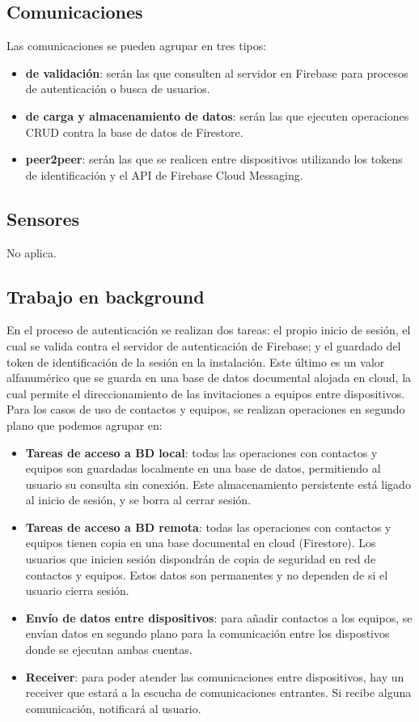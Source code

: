 \documentclass[a4paper,openright,12pt]{article}
\begin{document}
\subsection{Comunicaciones}
Las comunicaciones se pueden agrupar en tres tipos:
\begin{itemize}
    \item \textbf{de validación}: serán las que consulten al servidor en Firebase para procesos de autenticación o busca de usuarios.
    \item \textbf{de carga y almacenamiento de datos}: serán las que ejecuten operaciones CRUD contra la base de datos de Firestore.
    \item \textbf{peer2peer}: serán las que se realicen entre dispositivos utilizando los tokens de identificación y el API de Firebase Cloud Messaging.
\end{itemize}
\subsection{Sensores}
No aplica.
\subsection{Trabajo en background}
En el proceso de autenticación se realizan dos tareas: el propio inicio de sesión, el cual se valida contra el servidor de autenticación de Firebase; y el guardado del token de identificación de la sesión en la instalación. Este último es un valor alfanumérico que se guarda en una base de datos documental alojada en cloud, la cual permite el direccionamiento de las invitaciones a equipos entre dispositivos.
Para los casos de uso de contactos y equipos, se realizan operaciones en segundo plano que podemos agrupar en:
\begin{itemize}
    \item \textbf{Tareas de acceso a BD local}: todas las operaciones con contactos y equipos son guardadas localmente en una base de datos, permitiendo al usuario su consulta sin conexión. Este almacenamiento persistente está ligado al inicio de sesión, y se borra al cerrar sesión.
    \item \textbf{Tareas de acceso a BD remota}: todas las operaciones con contactos y equipos tienen copia en una base documental en cloud (Firestore). Los usuarios que inicien sesión dispondrán de copia de seguridad en red de contactos y equipos. Estos datos son permanentes y no dependen de si el usuario cierra sesión.
    \item \textbf{Envío de datos entre dispositivos}: para añadir contactos a los equipos, se envían datos en segundo plano para la comunicación entre los dispostivos donde se ejecutan ambas cuentas.
    \item \textbf{Receiver}: para poder atender las comunicaciones entre dispositivos, hay un receiver que estará a la escucha de comunicaciones entrantes. Si recibe alguna comunicación, notificará al usuario.
\end{itemize} 
\end{document}
